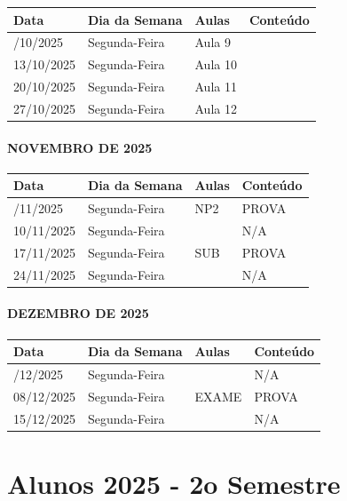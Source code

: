 \documentclass[
]{book}
\theoremstyle{definition}
\theoremstyle{definition}
\theoremstyle{definition}
\theoremstyle{definition}
\theoremstyle{remark}
\begin{document}
\begin{longtable}[]{@{}llll@{}}
\toprule\noalign{}
Data & Dia da Semana & Aulas & Conteúdo \\
\midrule\noalign{}
\endhead
\bottomrule\noalign{}
\endlastfoot
06/10/2025 & Segunda-Feira & Aula 9 & \\
13/10/2025 & Segunda-Feira & Aula 10 & \\
20/10/2025 & Segunda-Feira & Aula 11 & \\
27/10/2025 & Segunda-Feira & Aula 12 & \\
\end{longtable}

\paragraph{NOVEMBRO DE 2025}\label{novembro-de-2025}

\begin{longtable}[]{@{}llll@{}}
\toprule\noalign{}
Data & Dia da Semana & Aulas & Conteúdo \\
\midrule\noalign{}
\endhead
\bottomrule\noalign{}
\endlastfoot
03/11/2025 & Segunda-Feira & NP2 & PROVA \\
10/11/2025 & Segunda-Feira & & N/A \\
17/11/2025 & Segunda-Feira & SUB & PROVA \\
24/11/2025 & Segunda-Feira & & N/A \\
\end{longtable}

\paragraph{DEZEMBRO DE 2025}\label{dezembro-de-2025}

\begin{longtable}[]{@{}llll@{}}
\toprule\noalign{}
Data & Dia da Semana & Aulas & Conteúdo \\
\midrule\noalign{}
\endhead
\bottomrule\noalign{}
\endlastfoot
01/12/2025 & Segunda-Feira & & N/A \\
08/12/2025 & Segunda-Feira & EXAME & PROVA \\
15/12/2025 & Segunda-Feira & & N/A \\
\end{longtable}

\section{Alunos 2025 - 2o Semestre}\label{alunos-2025---2o-semestre}
\end{document}
